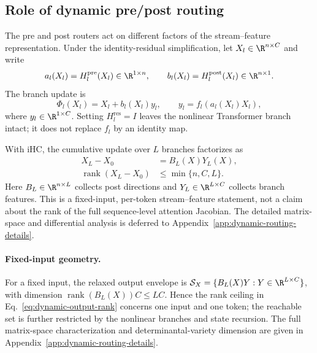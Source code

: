 \documentclass{article}
\newcommand{\Hpre}{H^{\mathrm{pre}}}
\newcommand{\Hpost}{H^{\mathrm{post}}}
\newcommand{\Hres}{H^{\mathrm{res}}}
\begin{document}
\subsection{Role of dynamic pre/post routing}
\label{sec:dynamic-pre-post}

The pre and post routers act on different factors of the stream--feature
representation. Under the identity-residual simplification, let
$X_l\in\R^{n\times C}$ and write
\begin{equation}
 a_l(X_l)=\Hpre_l(X_l)\in\R^{1\times n},\qquad
 b_l(X_l)=\Hpost_l(X_l)\in\R^{n\times 1}.
 \label{eq:dynamic-ab}
\end{equation}
The branch update is
\begin{equation}
 \Phi_l(X_l)=X_l+b_l(X_l)y_l,\qquad
 y_l=f_l\!\left(a_l(X_l)X_l\right),
 \label{eq:identity-dynamic-map}
\end{equation}
where $y_l\in\R^{1\times C}$. Setting $\Hres_l=I$ leaves the nonlinear
Transformer branch intact; it does not replace $f_l$ by an identity map.

With iHC, the cumulative update over $L$ branches factorizes as
\begin{equation}
 \begin{aligned}
 X_L-X_0&=B_L(X)Y_L(X),\\
 \operatorname{rank}(X_L-X_0)&\leq\min\{n,C,L\}.
 \end{aligned}
 \label{eq:dynamic-output-rank}
\end{equation}
Here $B_L\in\R^{n\times L}$ collects post directions and
$Y_L\in\R^{L\times C}$ collects branch features. This is a fixed-input,
per-token stream--feature statement, not a claim about the rank of the full
sequence-level attention Jacobian. The detailed matrix-space and differential
analysis is deferred to Appendix~\ref{app:dynamic-routing-details}.

\paragraph{Fixed-input geometry.}
For a fixed input, the relaxed output envelope is
$\mathcal S_X=\{B_L(X)Y:Y\in\R^{L\times C}\}$, with dimension
$\operatorname{rank}(B_L(X))C\leq LC$. Hence the rank ceiling in
Eq.~\ref{eq:dynamic-output-rank} concerns one input and one token; the
reachable set is further restricted by the nonlinear branches and state
recursion. The full matrix-space characterization and determinantal-variety
dimension are given in Appendix~\ref{app:dynamic-routing-details}.
\end{document}
